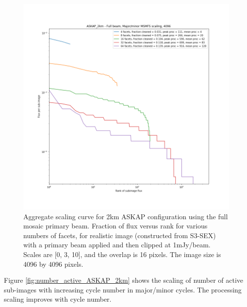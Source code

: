 \documentclass[11pt,a4paper,variablewidth]{article}
\begin{document}
\begin{figure}[h]
  \centering
  \includegraphics[width=\textwidth]{./pngs/full_askap_aggregate_scaling_ASKAP_2km_4096.png}
  \caption{Aggregate scaling curve for 2km ASKAP configuration using the full mosaic primary beam. Fraction of flux versus rank for various numbers of facets, for realistic image (constructed from S3-SEX) with a primary beam applied and then clipped at 1mJy/beam. Scales are [0, 3, 10], and the overlap is 16 pixels. The image size is 4096 by 4096 pixels.}
  \label{fig:full_askap_aggregate_scaling_2km}
\end{figure}

Figure \ref{fig:number_active_ASKAP_2km} shows the scaling of number of active sub-images with increasing cycle number in major/minor cycles. The processing scaling improves with cycle number.
\end{document}
